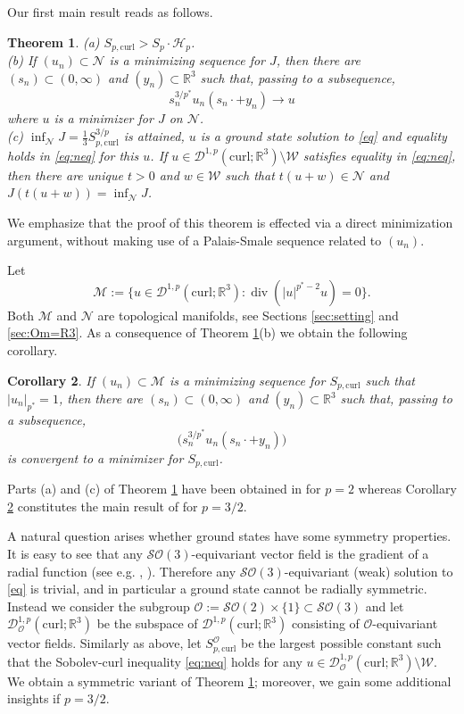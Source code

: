 \documentclass[12pt,leqno,twoside]{amsart}
\newtheorem{Th}{Theorem}[section]
\newtheorem{Cor}[Th]{Corollary}
\def\div{\mathop{\mathrm{div}}}
\def\R{\mathbb{R}}
\def\curl{\mathrm{curl}}
\def\Wc{\mathscr{W}}
\def\W{\mathcal{W}}
\newcommand{\SO}{\cS\cO}
\newcommand{\cD}{{\mathcal D}}
\newcommand{\cH}{{\mathcal H}}
\newcommand{\cM}{{\mathcal M}}
\newcommand{\cN}{{\mathcal N}}
\newcommand{\cO}{{\mathcal O}}
\newcommand{\cS}{{\mathcal S}}
\newcommand{\cW}{{\mathcal W}}
\def\Wc{\cD^{1,p}(\curl;\R^3)}
\def\Wco{\cD^{1,p}_{\cO}(\curl;\R^3)}
\numberwithin{equation}{section}
\begin{document}
Our first main result reads as follows.

\begin{Th}\label{Th:main1}
(a) $S_{p,\curl} > S_p\cdot\cH_p$. \\
(b)  If $(u_n)\subset \cN$ is a minimizing sequence for $J$, then there are $(s_n)\subset (0,\infty)$ and $(y_n)\subset \R^3$ such that, passing to a subsequence, 
$$
s_n^{3/p^*}u_n(s_n\cdot+y_n)\to u
$$ 
where $u$ is a minimizer for $J$ on $\cN$.\\
(c) $\inf_{\cN}J=\frac13S_{p,\curl}^{3/p}$ is attained,  $u$ is a ground state solution to \eqref{eq} and equality holds in \eqref{eq:neq} for this $u$. If $u\in\Wc\setminus\cW$ satisfies equality in \eqref{eq:neq}, then there are unique $t>0$ and $w\in\cW$ such that $t(u+w)\in\cN$ and $J(t(u+w))=\inf_{\cN} J$.
\end{Th}
 
We emphasize that the proof of this theorem is effected via a direct minimization argument, without making use of a Palais-Smale sequence related to $(u_n)$.


Let 
\begin{equation} \label{defM}
	\cM:=\Big\{u\in \Wc: \div(|u|^{p^*-2}u)=0\Big\}.
\end{equation}
Both $\cM$ and $\cN$ are topological manifolds, see Sections \ref{sec:setting} and \ref{sec:Om=R3}. As a consequence of Theorem \ref{Th:main1}(b) we obtain the following corollary.

\begin{Cor}\label{Cor}
If $(u_n)\subset \cM$ is a minimizing sequence for $S_{p,\curl}$ such that $|u_n|_{p^*}=1$, then there are $(s_n)\subset (0,\infty)$ and $(y_n)\subset \R^3$ such that, passing to a subsequence, 
$$\big(s_n^{3/p^*}u_n(s_n\cdot+y_n)\big)$$ is convergent to a minimizer for $S_{p,\curl}$.
\end{Cor}

Parts (a) and (c) of Theorem \ref{Th:main1} have been obtained in \cite{MedSz} for $p=2$ whereas Corollary \ref{Cor} constitutes the main result of \cite{FrankLoss2} for $p=3/2$.  


A natural question arises whether ground states have some symmetry properties. It is easy to see that  any $\SO(3)$-equivariant vector field is the gradient of a radial function (see e.g. \cite[Lemma 4]{Bartsch}, \cite[Theorem 1.3]{ClappSzulkin}). Therefore any $\SO(3)$-equivariant (weak) solution to \eqref{eq} is trivial, and in particular a ground state cannot be radially symmetric. Instead we consider the subgroup $\cO:=\SO(2)\times\{1\}\subset \SO(3)$ and let $\Wco$ be the subspace of  $\Wc$ consisting of $\cO$-equivariant vector fields. Similarly as above, let $S_{p,\curl}^{\cO}$ be the largest possible constant such that the Sobolev-curl inequality \eqref{eq:neq} holds for any $u\in \Wco\setminus \W$. We obtain a symmetric variant of Theorem \ref{Th:main1}; moreover, we gain some additional insights if $p=3/2$.
\end{document}

